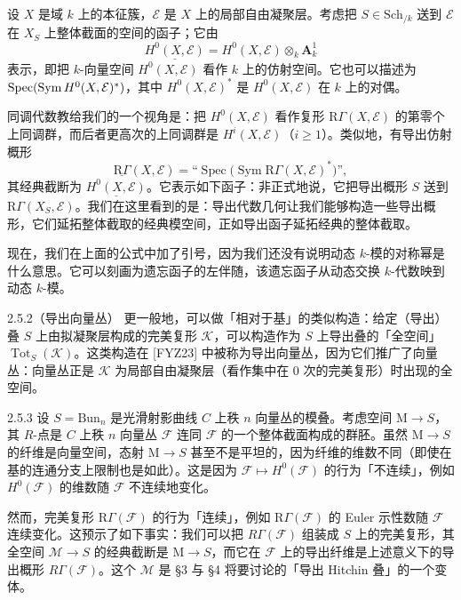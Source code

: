 设 $X$ 是域 $k$ 上的本征簇，$\mathcal E$ 是 $X$ 上的局部自由凝聚层。考虑把 $S\in\mathrm{Sch}_{/k}$ 送到 $\mathcal E$ 在 $X_S$ 上整体截面的空间的函子；它由
\[
\underline{H^0(X,\mathcal E)}=H^0(X,\mathcal E)\otimes_k\mathbf A^1_k
\]
表示，即把 $k$-向量空间 $H^0(X,\mathcal E)$ 看作 $k$ 上的仿射空间。它也可以描述为 $\operatorname{Spec}(\operatorname{Sym} H^0(X,\mathcal E)^*)$，其中 $H^0(X,\mathcal E)^*$ 是 $H^0(X,\mathcal E)$ 在 $k$ 上的对偶。

同调代数教给我们的一个视角是：把 $H^0(X,\mathcal E)$ 看作复形 $\mathrm{R}\Gamma(X,\mathcal E)$ 的第零个上同调群，而后者更高次的上同调群是 $H^i(X,\mathcal E)$（$i\ge1$）。类似地，有导出仿射概形
\[
\underline{\mathrm{R}\Gamma}(X,\mathcal E)=\text{“}\operatorname{Spec}\big(\operatorname{Sym}\mathrm{R}\Gamma(X,\mathcal E)^*\big)\text{”},
\]
其经典截断为 $\underline{H^0(X,\mathcal E)}$。它表示如下函子：非正式地说，它把导出概形 $S$ 送到 $\mathrm{R}\Gamma(X_S,\mathcal E)$。我们在这里看到的是：导出代数几何让我们能够构造一些导出概形，它们延拓整体截取的经典模空间，正如导出函子延拓经典的整体截取。

现在，我们在上面的公式中加了引号，因为我们还没有说明动态 $k$-模的对称幂是什么意思。它可以刻画为遗忘函子的左伴随，该遗忘函子从动态交换 $k$-代数映到动态 $k$-模。

\begin{rem}{2.5.2}（导出向量丛）\label{rem:a6-01-2}
更一般地，可以做「相对于基」的类似构造：给定（导出）叠 $S$ 上由拟凝聚层构成的完美复形 $\mathcal K$，可以构造作为 $S$ 上导出叠的「全空间」$\operatorname{Tot}_S(\mathcal K)$。这类构造在 [FYZ23] 中被称为导出向量丛，因为它们推广了向量丛：向量丛正是 $\mathcal K$ 为局部自由凝聚层（看作集中在 0 次的完美复形）时出现的全空间。
\end{rem}

\begin{exam}{2.5.3}\label{exam:a6-01-7}
设 $S=\mathrm{Bun}_n$ 是光滑射影曲线 $C$ 上秩 $n$ 向量丛的模叠。考虑空间 $\mathrm M\to S$，其 $R$-点是 $C$ 上秩 $n$ 向量丛 $\mathcal F$ 连同 $\mathcal F$ 的一个整体截面构成的群胚。虽然 $\mathrm M\to S$ 的纤维是向量空间，态射 $\mathrm M\to S$ 甚至不是平坦的，因为纤维的维数不同（即使在基的连通分支上限制也是如此）。这是因为 $\mathcal F\mapsto H^0(\mathcal F)$ 的行为「不连续」，例如 $H^0(\mathcal F)$ 的维数随 $\mathcal F$ 不连续地变化。

然而，完美复形 $\mathrm R\Gamma(\mathcal F)$ 的行为「连续」，例如 $\mathrm R\Gamma(\mathcal F)$ 的 Euler 示性数随 $\mathcal F$ 连续变化。这预示了如下事实：我们可以把 $R\Gamma(\mathcal F)$ 组装成 $S$ 上的完美复形，其全空间 $\mathcal M\to S$ 的经典截断是 $\mathrm M\to S$，而它在 $\mathcal F$ 上的导出纤维是上述意义下的导出概形 $R\Gamma(\mathcal F)$。这个 $\mathcal M$ 是 §3 与 §4 将要讨论的「导出 Hitchin 叠」的一个变体。
\end{exam}


